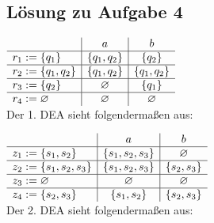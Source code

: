 \documentclass[10pt,oneside,onecolumn,a4paper,german,titlepage]{article}
\begin{document}
\newpage

\subsection*{Lösung zu Aufgabe 4}
$\begin{array}[t]{l|c|c}
& a & b \\
\hline
r_1 := \{q_1\} & \{q_1,q_2\} & \{q_2\} \\
\hline
r_2 := \{q_1,q_2\} & \{q_1,q_2\} & \{q_1,q_2\} \\
\hline
r_3 := \{q_2\} & \varnothing & \{q_1\} \\
\hline
r_4 := \varnothing & \varnothing & \varnothing
\end{array}$\\[4pt]
Der 1. DEA sieht folgendermaßen aus:
\begin{center}
\end{center}

$\begin{array}[t]{l|c|c}
& a & b \\
\hline
z_1 := \{s_1,s_2\} & \{s_1,s_2,s_3\} & \varnothing \\
\hline
z_2 := \{s_1,s_2,s_3\} & \{s_1,s_2,s_3\} & \{s_2,s_3\} \\
\hline
z_3 := \varnothing & \varnothing & \varnothing \\
\hline
z_4 := \{s_2,s_3\} & \{s_1,s_2\} & \{s_2,s_3\}
\end{array}$\\[4pt]
Der 2. DEA sieht folgendermaßen aus:
\begin{center}
\end{center}
\end{document}
